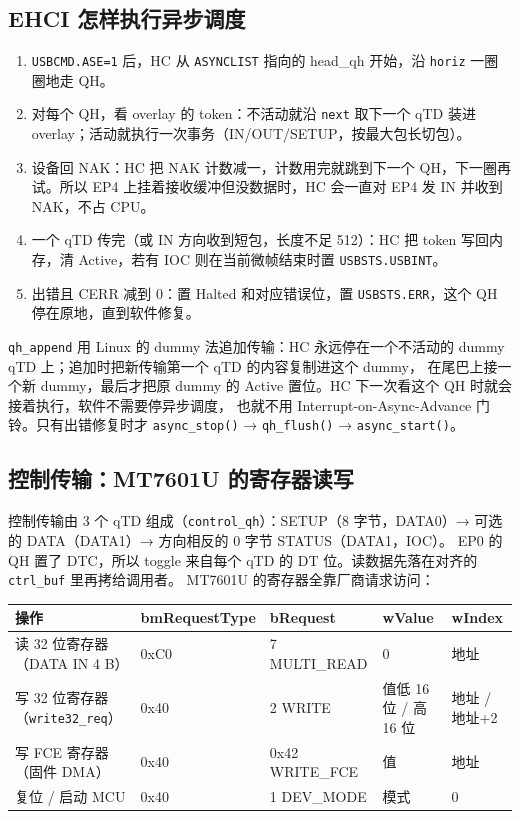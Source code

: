 \documentclass[UTF8,zihao=-4,fontset=none]{ctexart}
\newcommand{\fn}[1]{\texttt{#1}}
\begin{document}
\subsection{EHCI 怎样执行异步调度}

\begin{enumerate}[leftmargin=2em,itemsep=0pt]
\item \fn{USBCMD.ASE=1} 后，HC 从 \fn{ASYNCLIST} 指向的 head\_qh 开始，沿 \fn{horiz} 一圈圈地走 QH。
\item 对每个 QH，看 overlay 的 token：不活动就沿 \fn{next} 取下一个 qTD 装进 overlay；活动就执行一次事务（IN/OUT/SETUP，按最大包长切包）。
\item 设备回 NAK：HC 把 NAK 计数减一，计数用完就跳到下一个 QH，下一圈再试。所以 EP4 上挂着接收缓冲但没数据时，HC 会一直对 EP4 发 IN 并收到 NAK，不占 CPU。
\item 一个 qTD 传完（或 IN 方向收到短包，长度不足 512）：HC 把 token 写回内存，清 Active，若有 IOC 则在当前微帧结束时置 \fn{USBSTS.USBINT}。
\item 出错且 CERR 减到 0：置 Halted 和对应错误位，置 \fn{USBSTS.ERR}，这个 QH 停在原地，直到软件修复。
\end{enumerate}

\fn{qh\_append} 用 Linux 的 dummy 法追加传输：HC 永远停在一个不活动的 dummy qTD 上；追加时把新传输第一个 qTD 的内容复制进这个 dummy，
在尾巴上接一个新 dummy，最后才把原 dummy 的 Active 置位。HC 下一次看这个 QH 时就会接着执行，软件不需要停异步调度，
也就不用 Interrupt-on-Async-Advance 门铃。只有出错修复时才 \fn{async\_stop()} → \fn{qh\_flush()} → \fn{async\_start()}。

\subsection{控制传输：MT7601U 的寄存器读写}

控制传输由 3 个 qTD 组成（\fn{control\_qh}）：SETUP（8 字节，DATA0）→ 可选的 DATA（DATA1）→ 方向相反的 0 字节 STATUS（DATA1，IOC）。
EP0 的 QH 置了 DTC，所以 toggle 来自每个 qTD 的 DT 位。读数据先落在对齐的 \fn{ctrl\_buf} 里再拷给调用者。
MT7601U 的寄存器全靠厂商请求访问：

\begin{table}[H]\centering\small
\begin{tabular}{p{44mm}p{20mm}p{26mm}p{26mm}p{18mm}}
\toprule
操作 & bmRequest\-Type & bRequest & wValue & wIndex \\ \midrule
读 32 位寄存器（DATA IN 4 B） & 0xC0 & 7 MULTI\_READ & 0 & 地址 \\
写 32 位寄存器（\fn{write32\_req}） & 0x40 & 2 WRITE & 值低 16 位 / 高 16 位 & 地址 / 地址+2 \\
写 FCE 寄存器（固件 DMA） & 0x40 & 0x42 WRITE\_FCE & 值 & 地址 \\
复位 / 启动 MCU & 0x40 & 1 DEV\_MODE & 模式 & 0 \\
\bottomrule
\end{tabular}
\end{table}
\end{document}
